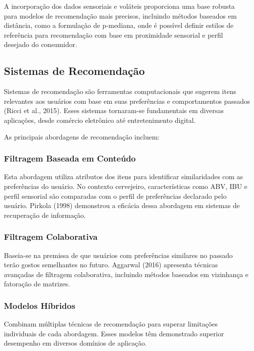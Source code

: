\documentclass[12pt,a4paper]{article}
\begin{document}
A incorporação dos dados sensoriais e voláteis proporciona uma base robusta para modelos de recomendação mais precisos, incluindo métodos baseados em distância, como a formulação de p-mediana, onde é possível definir estilos de referência para recomendação com base em proximidade sensorial e perfil desejado do consumidor.

\subsection{Sistemas de Recomendação}

Sistemas de recomendação são ferramentas computacionais que sugerem itens relevantes aos usuários com base em suas preferências e comportamentos passados (Ricci et al., 2015). Esses sistemas tornaram-se fundamentais em diversas aplicações, desde comércio eletrônico até entretenimento digital.

As principais abordagens de recomendação incluem:

\subsubsection{Filtragem Baseada em Conteúdo}

Esta abordagem utiliza atributos dos itens para identificar similaridades com as preferências do usuário. No contexto cervejeiro, características como ABV, IBU e perfil sensorial são comparadas com o perfil de preferências declarado pelo usuário. Pirkola (1998) demonstrou a eficácia dessa abordagem em sistemas de recuperação de informação.

\subsubsection{Filtragem Colaborativa}

Baseia-se na premissa de que usuários com preferências similares no passado terão gostos semelhantes no futuro. Aggarwal (2016) apresenta técnicas avançadas de filtragem colaborativa, incluindo métodos baseados em vizinhança e fatoração de matrizes.

\subsubsection{Modelos Híbridos}

Combinam múltiplas técnicas de recomendação para superar limitações individuais de cada abordagem. Esses modelos têm demonstrado superior desempenho em diversos domínios de aplicação.
\end{document}
